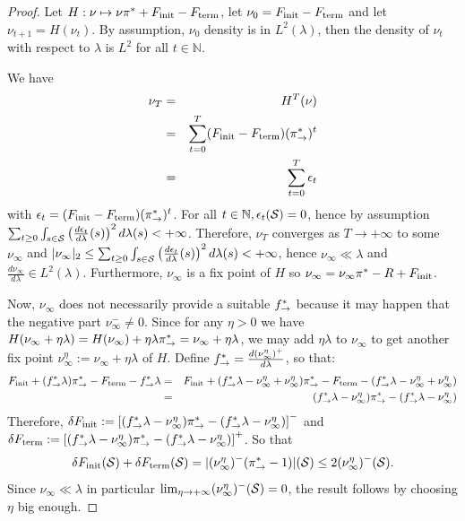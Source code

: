 \documentclass{article}
\theoremstyle{plain}
\theoremstyle{definition}
\theoremstyle{remark}
\theoremstyle{fact}
\begin{document}
\begin{proof}
    Let $H:\nu \mapsto \nu\pi^*+F_{\mathrm{init}} - F_{\mathrm{term}}$,  let $\nu_0=F_{\mathrm{init}}-F_{\mathrm{term}}$ and let $\nu_{t+1} = H(\nu_t)$. By assumption, $\nu_0$ density is in $L^2(\lambda)$, then the density of $\nu_t$ with respect to $\lambda$ is $L^2$ for all $t\in \mathbb N$.
    
    We have
    \begin{eqnarray}
    \nu_T &=& H^T(\nu)   \\
    &=& \sum_{t=0}^T (F_{\mathrm{init}}-F_{\mathrm{term}})(\pi_{\rightarrow}^*)^t \\
    &=& \sum_{t=0}^T\epsilon_t
    \end{eqnarray}
    with $\epsilon_t =  (F_{\mathrm{init}}-F_{\mathrm{term}})(\pi_{\rightarrow}^*)^t$.  
    For all $t\in \mathbb N, \epsilon_t(\mathcal S)=0$, hence by assumption  
    $\sum_{t\geq 0}\int_{s\in \mathcal S}\left(\frac{d\epsilon_t}{d\lambda}(s)\right)^2d\lambda(s)< +\infty$. Therefore, $\nu_T$ converges as $T\rightarrow +\infty$ to  some $\nu_{\infty}$ and $|\nu_\infty |_2\leq \sum_{t\geq 0}\int_{s\in \mathcal S}\left(\frac{d\epsilon_t}{d\lambda}(s)\right)^2d\lambda(s)<+\infty$, hence $\nu_{\infty}\ll \lambda$ and $\frac{d\nu_\infty}{d\lambda}\in L^2(\lambda)$. 
    Furthermore, $\nu_{\infty}$ is a fix point of $H$ so $\nu_{\infty} =  \nu_\infty \pi^*- R + F_{\mathrm{init}}$. 
   
    Now, $\nu_\infty$ does not necessarily provide a suitable $f^*_{\rightarrow}$ because it may happen that the negative part $\nu_\infty^-\neq 0$.
    Since for any $\eta > 0$ we have $H(\nu_\infty + \eta\lambda) = H(\nu_\infty) + \eta \lambda \pi_{\rightarrow}^* = \nu_\infty + \eta \lambda$, we may add $\eta \lambda$ to $\nu_\infty$ to get another fix point $\nu_\infty^\eta := \nu_\infty +\eta\lambda$ of $H$. Define $f^*_{\rightarrow}= \frac{d(\nu_\infty^\eta)^+}{d\lambda}$, so that: 
    \begin{eqnarray}
        F_{\mathrm{init}} + (f^*_{\rightarrow} \lambda)\pi_{\rightarrow}^* - F_{\mathrm{term}} - f^*_{\rightarrow}\lambda &=&  F_{\mathrm{init}} + (f^*_{\rightarrow} \lambda- \nu_\infty^\eta + \nu_\infty^\eta)\pi_{\rightarrow}^* - F_{\mathrm{term}} -  (f^*_{\rightarrow} \lambda- \nu_\infty^\eta + \nu_\infty^\eta) \\ 
        &=& (f^*_{\rightarrow} \lambda- \nu_\infty^\eta)\pi_{\rightarrow}^*  -  (f^*_{\rightarrow} \lambda- \nu_\infty^\eta) 
    \end{eqnarray}
    Therefore, $\delta F_{\mathrm{init}} := \left[(f^*_{\rightarrow} \lambda- \nu_\infty^\eta)\pi_{\rightarrow}^*  -  (f^*_{\rightarrow} \lambda- \nu_\infty^\eta)\right]^-$ and 
     $\delta F_{\mathrm{term}} := \left[(f^*_{\rightarrow} \lambda- \nu_\infty^\eta)\pi_{\rightarrow}^*  -  (f^*_{\rightarrow} \lambda- \nu_\infty^\eta)\right]^+$. 
    So that
     \begin{equation}\delta F_{\mathrm{init}}(\mathcal S)+\delta F_{\mathrm{term}}(\mathcal S)=|(\nu_\infty^\eta)^-(\pi_{\rightarrow}^*-1)|(\mathcal S) \leq 2(\nu_\infty^\eta)^-(\mathcal S).
     \end{equation}
     Since $\nu_\infty\ll \lambda$ in particular $\lim_{\eta\rightarrow +\infty} (\nu_\infty^\eta)^-(\mathcal S) = 0$, the result follows by choosing $\eta$ big enough.
\end{proof}
\end{document}
